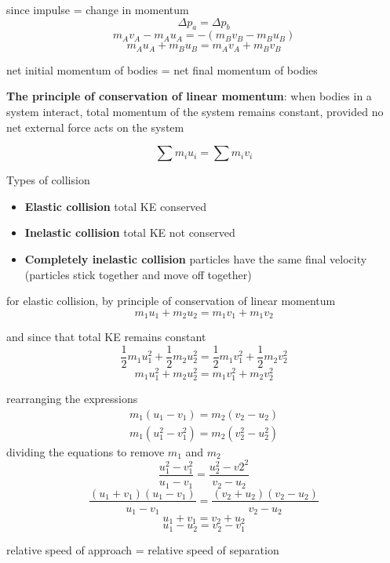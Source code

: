 \documentclass[a4paper, 10pt]{article}
\begin{document}
since impulse = change in momentum
\[
  \Delta p_a = \Delta p_b
\]
\[
   m_A v_A - m_A u_A = -(m_B v_B - m_B u_B)
\]
\[
   m_A u_A + m_B u_B = m_A v_A + m_B v_B
\]

\begin{center}
   net initial momentum of bodies = net final momentum of bodies
\end{center}	

\begin{framed}
  \textbf{The principle of conservation of linear momentum}: when bodies in a system interact, total momentum of the system remains constant, provided no net external force acts on the system   

  \[
  \sum m_i u_i = \sum m_i v_i
  \]
  
\end{framed}	

Types of collision
\begin{itemize}
   \item \textbf{Elastic collision} total KE conserved
   \item \textbf{Inelastic collision} total KE not conserved
   \item \textbf{Completely inelastic collision} particles have the same final velocity (particles stick together and move off together)
\end{itemize}	

for elastic collision, by principle of conservation of linear momentum
\[
m_1 u_1 + m_2 u_2 = m_1 v_1 + m_1 v_2
\]

and since that total KE remains constant
\[
   \frac{1}{2} m_1 u_1^2 + \frac{1}{2} m_2 u_2^2 =
   \frac{1}{2} m_1 v_1^2 + \frac{1}{2} m_2 v_2^2
\]
\[
   m_1 u_1^2 + m_2 u_2^2 =
   m_1 v_1^2 + m_2 v_2^2
\]

rearranging the expressions
\begin{align*}
   m_1 (u_1 - v_1) = m_2 (v_2 - u_2) \\
   m_1 (u_1^2 - v_1^2) = m_2(v_2^2 - u^2_2)
\end{align*}	
dividing the equations to remove $m_1$ and $m_2$ 
\[
 \frac{u_1^2 - v_1^2}{u_1 - v_1} = \frac{u_2^2- v2^2}{v_2 - u_2}
\]
\[
   \frac{(u_1+v_1)(u_1 -v_1)}{u_1 - v_1} = \frac{(v_2+u_2)(v_2 - u_2)}{v_2 - u_2}
\]
\[
u_1 + v_1 = v_2 + u_2
\]
\[
u_1 - u_2 = v_2 - v_1
\]
\begin{center}
   relative speed of approach = relative speed of separation
\end{center}	
\end{document}
